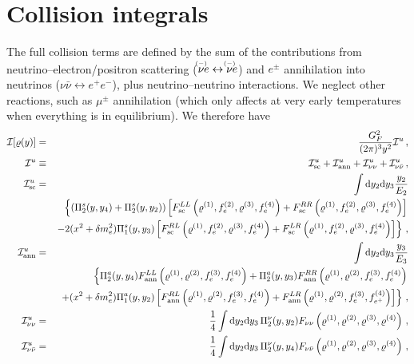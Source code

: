 \documentclass[notitlepage,nofootinbib,showpacs,preprintnumbers,amsmath,amssymb,superscriptaddress,prd,onecolumn]{revtex4-1}
\newcommand{\nua}[1]{\ensuremath{\rlap{\kern-2.5pt\ensuremath{\overset{\scriptscriptstyle(-)}{\phantom{\nu}}}}{\ensuremath{{\nu}_{#1}}}}}
\begin{document}
\section{Collision integrals}
\label{sec:collint}
The full collision terms are defined by the sum
of the contributions from neutrino--electron/positron scattering
($\nua{} e\leftrightarrow \nua{} e$)
and
$e^\pm$ annihilation into neutrinos ($\nu\bar\nu\leftrightarrow e^+e^-$),
plus neutrino--neutrino interactions.
We neglect other reactions, such as $\mu^\pm$ annihilation (which only affects at very early temperatures when everything is in equilibrium).
We therefore have \cite{deSalas:2016ztq,Bennett:2020zkv}
%
\begin{eqnarray}
\mathcal{I}[\varrho(y)]
&=&
\frac{G_F^2}{(2\pi)^3y^2}
\mathcal{I}^u\,,
\label{eq:collint}
\\
\mathcal{I}^u
&\equiv&
\mathcal{I}_{\rm sc}^u
+ \mathcal{I}_{\rm ann}^u
+ \mathcal{I}_{\nu\nu}^u
+ \mathcal{I}_{\nu\bar\nu}^u
\,,
\label{eq:unnormcollint}
\\
\mathcal{I}_{\rm sc} ^u
&=&
\int {\rm d}y_2 {\rm d}y_3 \frac{y_2}{E_2}
\label{eq:I_sc}
\\
&&
\left\{\left(\Pi_2^s(y, y_4)+\Pi_2^s(y, y_2)\right)
    \left[
    F_{\rm sc}^{LL}\left(\varrho^{(1)}, f_e^{(2)}, \varrho^{(3)}, f_e^{(4)}\right)
    +F_{\rm sc}^{RR}\left(\varrho^{(1)}, f_e^{(2)}, \varrho^{(3)}, f_e^{(4)}\right)\right]\right.
    \nonumber\\
    &&\left.-2(x^2+\delta m_e^2)\Pi_1^s(y,y_3)
    \left[
     F_{\rm sc}^{RL}\left(\varrho^{(1)}, f_e^{(2)}, \varrho^{(3)}, f_e^{(4)}\right)
    +F_{\rm sc}^{LR}\left(\varrho^{(1)}, f_e^{(2)}, \varrho^{(3)}, f_e^{(4)}\right)
    \right]\nonumber
\right\}\,,
\\
\mathcal{I}_{\rm ann}^u
&=&
\int {\rm d}y_2 {\rm d}y_3 \frac{y_3}{E_3}
\label{eq:I_ann}\\
    &&\left\{\Pi_2^a(y, y_4)F_{\rm ann}^{LL}\left(\varrho^{(1)}, \varrho^{(2)}, f_e^{(3)}, f_e^{(4)}\right)
    +\Pi_2^a(y, y_3)F_{\rm ann}^{RR}\left(\varrho^{(1)}, \varrho^{(2)}, f_e^{(3)}, f_e^{(4)}\right)\right.
\nonumber\\
    &&\left.+ (x^2+\delta m_e^2)\Pi_1^a(y,y_2)
    \left[
    F_{\rm ann}^{RL}\left(\varrho^{(1)}, \varrho^{(2)}, f_e^{(3)}, f_e^{(4)}\right)
    +F_{\rm ann}^{LR}\left(\varrho^{(1)}, \varrho^{(2)}, f_e^{(3)}, f_{e^+}^{(4)}\right)
    \right]\nonumber
\right\}\,,
\\
\mathcal{I}_{\nu\nu} ^u
&=&
\frac{1}{4}
\int {\rm d}y_2 {\rm d}y_3\,
\Pi_2^\nu(y, y_2)
F_{\nu\nu}\left(\varrho^{(1)}, \varrho^{(2)}, \varrho^{(3)}, \varrho^{(4)}\right)
\,,
\label{eq:I_nunu}
\\
\mathcal{I}_{\nu\bar\nu} ^u
&=&
\frac{1}{4}
\int {\rm d}y_2 {\rm d}y_3\,
\Pi_2^\nu(y, y_4)
F_{\nu\bar\nu}\left(\varrho^{(1)}, \varrho^{(2)}, \varrho^{(3)}, \varrho^{(4)}\right)
\label{eq:I_nubarnu}
\,,
\end{eqnarray}
\end{document}
